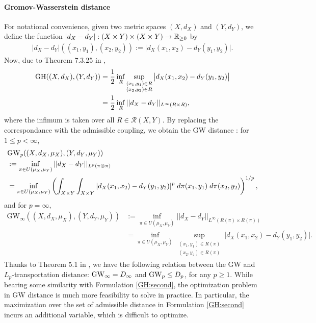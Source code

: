 \paragraph{Gromov-Wasserstein distance}
For notational convenience, given two metric spaces $(X, d_X)$ and $(Y, d_Y)$,
we define the function $|d_X - d_Y|: (X \times Y) \times (X \times Y) \to \mathbb R_{\geq 0}$ by
\begin{align}
    |d_X - d_Y|((x_1, y_1), (x_2, y_2)) := \big\vert d_X(x_1, x_2) - d_Y(y_1, y_2) \big\vert.
\end{align}
Now, due to Theorem 7.3.25 in \citep{Burago01},
\begin{align}
  \text{GH}((X,d_X), (Y,d_Y)) &= \frac{1}{2} \inf_{R}
  \sup_{\substack{(x_1,y_1) \in R \\ (x_2,y_2) \in R}} \big| d_X(x_1, x_2) - d_Y(y_1, y_2) \big| \\
  &= \frac{1}{2} \inf_{R} || d_X - d_Y ||_{L^{\infty}(R \times R)},
\end{align}
where the infimum is taken over all $R \in \mathcal R(X,Y)$. By replacing the correspondance
with the admissible coupling, we obtain the GW distance \citep{Memoli07,Memoli11}:
for $1 \leq p < \infty$,
\begin{align}
    &\text{GW}_p((X, d_X, \mu_X), (Y, d_Y, \mu_Y)) \\
    &:= \inf_{ \pi \in U(\mu_X, \mu_Y)} || d_X - d_Y ||_{L^p(\pi \otimes \pi)} \\
    &= \inf_{ \pi \in U(\mu_X, \mu_Y)}
    \left( \int_{X \times Y} \int_{X \times Y} |d_X(x_1, x_2) - d_Y(y_1, y_2)|^p \;
    d\pi(x_1, y_1) \; d\pi(x_2, y_2) \right)^{1 / p},
\end{align}
and for $p = \infty$,
\begin{align}
    \text{GW}_{\infty}((X, d_X, \mu_X), (Y, d_Y, \mu_Y)) &:=
    \inf_{ \pi \in U(\mu_X, \mu_Y)} || d_X - d_Y ||_{L^{\infty}(R(\pi) \times R(\pi))} \\
    &= \inf_{ \pi \in U(\mu_X, \mu_Y)}
    \sup_{\substack{(x_1,y_1) \in R(\pi) \\ (x_2,y_2) \in R(\pi)}}
    \big| d_X(x_1, x_2) - d_Y(y_1, y_2) \big|.
\end{align}
Thanks to Theorem 5.1 in \citep{Memoli11b},
we have the following relation between the GW and $L_p$-transportation distance:
$\text{GW}_{\infty} = D_{\infty}$ and $\text{GW}_p \leq D_p$, for any $p \geq 1$.
While bearing some similarity with Formulation \eqref{GH:second},
the optimization problem in GW distance is
much more feasibility to solve in practice. In particular, the maximization over
the set of admissible distance in Formulation \eqref{GH:second} incurs an additional variable,
which is difficult to optimize.

